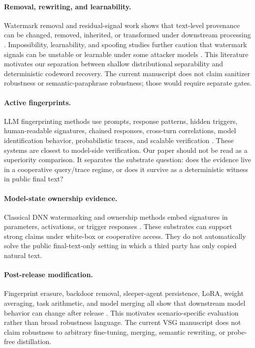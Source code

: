 \paragraph{Removal, rewriting, and learnability.}
Watermark removal and residual-signal work shows that text-level provenance can
be changed, removed, inherited, or transformed under downstream processing
\cite{chen2025demark,sander2024radioactive}.  Impossibility, learnability, and
spoofing studies further caution that watermark signals can be unstable or
learnable under some attacker models
\cite{zhang2023watermarkssand,gu2023learnability,an2025ditto}.  This
literature motivates our separation between shallow distributional
separability and deterministic codeword recovery.  The current manuscript does
not claim sanitizer robustness or semantic-paraphrase robustness; those would
require separate gates.

\paragraph{Active fingerprints.}
LLM fingerprinting methods use prompts, response patterns, hidden triggers,
human-readable signatures, chained responses, cross-turn correlations, model
identification behavior, probabilistic traces, and scalable verification
\cite{xu2024instructional,zeng2024huref,russinovich2024chainhash,pasquini2025llmmap,yang2024fingerprint,iourovitski2024hide,yamabe2025mergeprint,xu2025ctcc,xu2025evertracer,bai2025esf,hu2025resf,nasery2025scalable,tsai2025rofl}.
These systems are closest to model-side verification.  Our paper should not be
read as a superiority comparison.  It separates the substrate question: does
the evidence live in a cooperative query/trace regime, or does it survive as a
deterministic witness in public final text?

\paragraph{Model-state ownership evidence.}
Classical DNN watermarking and ownership methods embed signatures in
parameters, activations, or trigger responses
\cite{uchida2017embedding,zhang2018protecting,adi2018turning,rouhani2019deepsigns,jia2021entangled,szyller2021dawn,krauss2024clearstamp}.
These substrates can support strong claims under white-box or cooperative
access.  They do not automatically solve the public final-text-only setting in
which a third party has only copied natural text.

\paragraph{Post-release modification.}
Fingerprint erasure, backdoor removal, sleeper-agent persistence, LoRA,
weight averaging, task arithmetic, and model merging all show that downstream
model behavior can change after release
\cite{zhang2025meraser,zeng2024beear,li2024backdoor,hubinger2024sleeper,hu2021lora,wortsman2022model,ilharco2023task,yadav2023ties}.
This motivates scenario-specific evaluation rather than broad robustness
language.  The current VSG manuscript does not claim robustness to arbitrary
fine-tuning, merging, semantic rewriting, or probe-free distillation.


